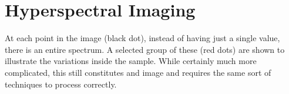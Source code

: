 \documentclass[letterpaper,10pt,english]{sphinxmanual}
\begin{document}
\begin{sphinxVerbatim}[commandchars=\\\{\}]
    
\PYG{p}{[}\PYG{p}{]} \PYG{p}{[}\PYG{p}{]}   \PYG{p}{[}\PYG{p}{]}   \PYG{p}{[}\PYG{p}{]}
\end{sphinxVerbatim}

\noindent{}


\section{Hyperspectral Imaging}
\label{\detokenize{01-Introduction:hyperspectral-imaging}}
\sphinxAtStartPar
At each point in the image (black dot), instead of having just a single value, there is an entire spectrum. A selected group of these (red dots) are shown to illustrate the variations inside the sample. While certainly much more complicated, this still constitutes and image and requires the same sort of techniques to process correctly.
\end{document}
